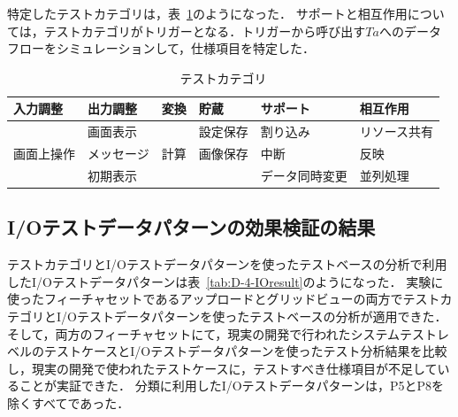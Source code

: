 特定したテストカテゴリは，表~\ref{tab:D-4-TestCategory}のようになった．
サポートと相互作用については，テストカテゴリがトリガーとなる．トリガーから呼び出す$Ta$へのデータフローをシミュレーションして，仕様項目を特定した．


\begin{table}[htbp]
  \centering
  \caption{テストカテゴリ}
    \begin{tabular}{|l|p{5.415em}|l|l|l|l|}
    \hline
          \multicolumn{1}{|p{4em}|}{入力調整} & 出力調整 & \multicolumn{1}{p{2.5em}|}{変換} & \multicolumn{1}{p{3em}|}{貯蔵} & \multicolumn{1}{p{6em}|}{サポート} & \multicolumn{1}{p{6em}|}{相互作用} \bigstrut\\
    \hline
    \hline
\multicolumn{1}{|l|}{\multirow{3}[2]{*}{画面上操作}} & 画面表示  & \multicolumn{1}{l|}{\multirow{3}[2]{*}{計算}} & \multicolumn{1}{p{4em}|}{設定保存} & 割り込み  & リソース共有 \bigstrut[t]\\
                & メッセージ &       & \multicolumn{1}{p{4em}|}{画像保存} & 中断    & 反映 \\
                & 初期表示  &       &       & データ同時変更 & 並列処理 \bigstrut[b]\\
    \hline
    \end{tabular}%
  \label{tab:D-4-TestCategory}%
\end{table}%

\subsection{I/Oテストデータパターンの効果検証の結果}
テストカテゴリとI/Oテストデータパターンを使ったテストベースの分析で利用したI/Oテストデータパターンは表~\ref{tab:D-4-IOresult}のようになった．
実験に使ったフィーチャセットであるアップロードとグリッドビューの両方でテストカテゴリとI/Oテストデータパターンを使ったテストベースの分析が適用できた．
そして，両方のフィーチャセットにて，現実の開発で行われたシステムテストレベルのテストケースとI/Oテストデータパターンを使ったテスト分析結果を比較し，現実の開発で使われたテストケースに，テストすべき仕様項目が不足していることが実証できた．
分類に利用したI/Oテストデータパターンは，P5とP8を除くすべてであった．

